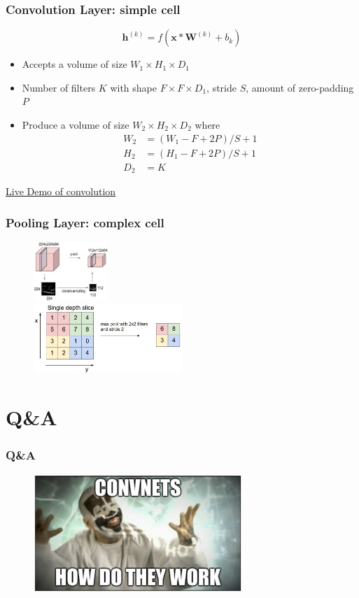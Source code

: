 \documentclass{beamer}
\begin{document}
\begin{frame}
  \frametitle{Convolution Layer: simple cell}

  \begin{equation*}
    \mathbf{h}^{(k)}=f(\mathbf{x}*\mathbf{W}^{(k)}+b_{k})
  \end{equation*}

  \begin{itemize}
    \item Accepts a volume of size $W_{1}\times H_{1}\times D_{1}$
    \item Number of filters $K$ with shape $F\times F\times D_{1}$, stride $S$, amount of zero-padding $P$
    \item Produce a volume of size $W_{2}\times H_{2}\times D_{2}$ where
      \begin{align*}
        W_{2}&=(W_{1}-F+2P)/S+1 \\
        H_{2}&=(H_{1}-F+2P)/S+1 \\
        D_{2}&=K
      \end{align*}
  \end{itemize}

  \href{http://rt.dgyblog.com/res/dlworkshop/conv_demo.html}{Live Demo of convolution}
\end{frame}

\begin{frame}
  \frametitle{Pooling Layer: complex cell}

  \begin{figure}
    \centering
    \includegraphics[width=0.25\textwidth]{pool.jpeg}\\
    \includegraphics[width=0.5\textwidth]{maxpool.jpeg}
  \end{figure}
\end{frame}

\section*{Q\&A}

\begin{frame}
  \frametitle{Q\&A}
  \begin{figure}
    \centering
    \includegraphics[width=0.7\textwidth]{convnet_how_to_work.png}
  \end{figure}
\end{frame}
\end{document}
